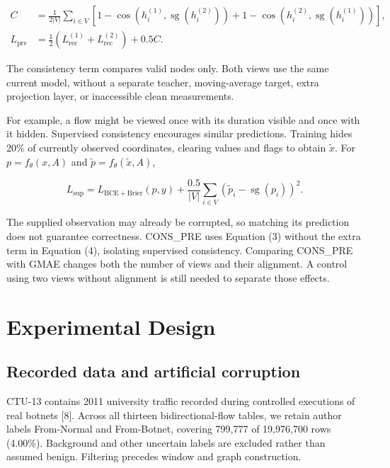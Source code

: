 \documentclass[11pt,letterpaper]{article}
\begin{document}
\[
\begin{aligned}C&=\frac{1}{2|V|}\sum_{i\in V}
\left[1-\cos(h_i^{(1)},\operatorname{sg}(h_i^{(2)}))
+1-\cos(h_i^{(2)},\operatorname{sg}(h_i^{(1)}))\right],
\\[3pt]
L_{\mathrm{pre}}&=\tfrac12(L_{\mathrm{rec}}^{(1)}+L_{\mathrm{rec}}^{(2)})+0.5C.
\end{aligned}
\tag{3}
\]

The consistency term compares valid nodes only. Both views use the same current model, without a separate teacher, moving-average target, extra projection layer, or inaccessible clean measurements.\par

For example, a flow might be viewed once with its duration visible and once with it hidden. Supervised consistency encourages similar predictions. Training hides 20\% of currently observed coordinates, clearing values and flags to obtain \(\tilde x\). For \(p=f_\theta(x,A)\) and \(\tilde p=f_\theta(\tilde x,A)\),\par

\[
L_{\mathrm{sup}}=L_{\mathrm{BCE+Brier}}(p,y)
+\frac{0.5}{|V|}\sum_{i\in V}(\tilde p_i-\operatorname{sg}(p_i))^2.
\tag{4}
\]

The supplied observation may already be corrupted, so matching its prediction does not guarantee correctness. CONS\_PRE uses Equation (3) without the extra term in Equation (4), isolating supervised consistency. Comparing CONS\_PRE with GMAE changes both the number of views and their alignment. A control using two views without alignment is still needed to separate those effects.\par

\section{Experimental Design}

\subsection{Recorded data and artificial corruption}

CTU-13 contains 2011 university traffic recorded during controlled executions of real botnets [8]. Across all thirteen bidirectional-flow tables, we retain author labels From-Normal and From-Botnet, covering 799,777 of 19,976,700 rows (4.00\%). Background and other uncertain labels are excluded rather than assumed benign. Filtering precedes window and graph construction.\par
\end{document}
